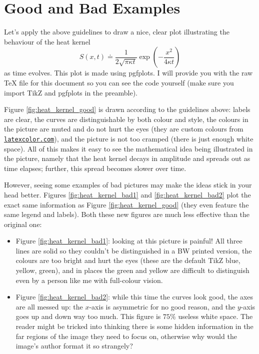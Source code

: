 \documentclass[12pt]{article}
\begin{document}
\section{Good and Bad Examples}
\noindent Let's apply the above guidelines to draw a nice, clear plot illustrating the behaviour of the heat kernel
$$
S(x,t) \doteq \frac{1}{2\sqrt{\pi \kappa t}}\exp\left(-\frac{x^2}{4\kappa t}\right)
$$
as time evolves. This plot is made using pgfplots. I will provide you with the raw TeX file for this document so you can see the code yourself (make sure you import TikZ and pgfplots in the preamble). 
\par Figure \ref{fig:heat_kernel_good} is drawn according to the guidelines above: labels are clear, the curves are distinguishable by both colour and style, the colours in the picture are muted and do not hurt the eyes (they are custom colours from \href{http://latexcolor.com/}{\texttt{latexcolor.com}}), and the picture is not too cramped (there is just enough white space). All of this makes it easy to see the mathematical idea being illustrated in the picture, namely that the heat kernel decays in amplitude and spreads out as time elapses; further, this spread becomes slower over time. 
\par However, seeing some examples of bad pictures may make the ideas stick in your head better. Figures \ref{fig:heat_kernel_bad1} and \ref{fig:heat_kernel_bad2} plot the exact same information as Figure \ref{fig:heat_kernel_good} (they even feature the same legend and labels). Both these new figures are much less effective than the original one: 
\begin{itemize}
    \item Figure \ref{fig:heat_kernel_bad1}: looking at this picture is painful! All three lines are solid so they couldn't be distinguished in a BW printed version, the colours are too bright and hurt the eyes (these are the default TikZ blue, yellow, green), and in places the green and yellow are difficult to distinguish even by a person like me with full-colour vision. 
    \item Figure \ref{fig:heat_kernel_bad2}: while this time the curves look good, the axes are all messed up: the $x$-axis is asymmetric for no good reason, and the $y$-axis goes up and down way too much. This figure is $75\%$ useless white space. The reader might be tricked into thinking there is some hidden information in the far regions of the image they need to focus on, otherwise why would the image's author format it so strangely? 
\end{itemize}
\end{document}
